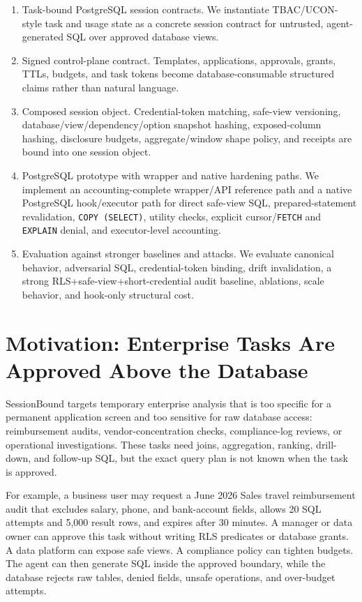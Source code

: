 \documentclass[journal]{IEEEtran}
\begin{document}
\begin{enumerate}
\def\labelenumi{\arabic{enumi}.}
\item
  Task-bound PostgreSQL session contracts. We instantiate TBAC/UCON-style
  task and usage state as a concrete session contract for untrusted,
  agent-generated SQL over approved database views.
\item
  Signed control-plane contract. Templates, applications, approvals,
  grants, TTLs, budgets, and task tokens become database-consumable
  structured claims rather than natural language.
\item
  Composed session object. Credential-token matching, safe-view
  versioning, database/view/dependency/option snapshot hashing,
  exposed-column hashing, disclosure budgets, aggregate/window shape
  policy, and receipts are bound into one session object.
\item
  PostgreSQL prototype with wrapper and native hardening paths.
  We implement an accounting-complete wrapper/API reference path and a
  native PostgreSQL hook/executor path for direct safe-view SQL,
  prepared-statement revalidation, \texttt{COPY (SELECT)}, utility
  checks, explicit cursor/\texttt{FETCH} and \texttt{EXPLAIN} denial,
  and executor-level accounting.
\item
  Evaluation against stronger baselines and attacks. We evaluate
  canonical behavior, adversarial SQL, credential-token binding, drift
  invalidation, a strong RLS+safe-view+short-credential audit baseline,
  ablations, scale behavior, and hook-only structural cost.
\end{enumerate}


\hypertarget{motivation-enterprise-tasks-are-approved-above-the-database}{%
\section{Motivation: Enterprise Tasks Are Approved Above the
Database}\label{motivation-enterprise-tasks-are-approved-above-the-database}}

SessionBound targets temporary enterprise analysis that is too specific
for a permanent application screen and too sensitive for raw database
access: reimbursement audits, vendor-concentration checks, compliance-log
reviews, or operational investigations. These tasks need joins,
aggregation, ranking, drill-down, and follow-up SQL, but the exact query
plan is not known when the task is approved.

For example, a business user may request a June 2026 Sales travel
reimbursement audit that excludes salary, phone, and bank-account
fields, allows 20 SQL attempts and 5,000 result rows, and expires after
30 minutes. A manager or data owner can approve this task without writing RLS
predicates or database grants. A data platform can expose safe views. A
compliance policy can tighten budgets. The agent can then generate SQL
inside the approved boundary, while the database rejects raw tables,
denied fields, unsafe operations, and over-budget attempts.
\end{document}
